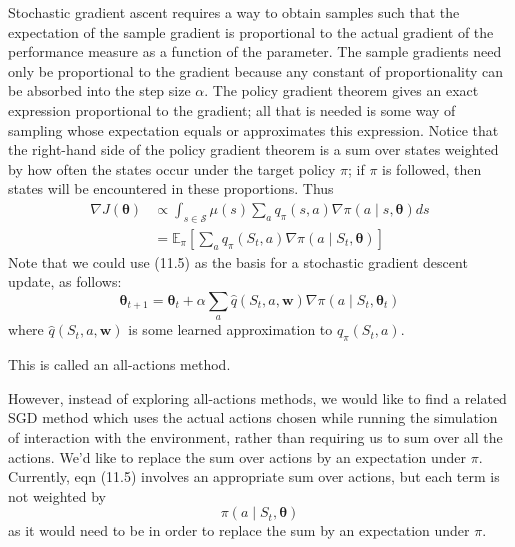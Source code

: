 \documentclass[11pt]{article}
\theoremstyle{plain} %
\theoremstyle{remark}
\begin{document}
Stochastic gradient ascent requires a way to obtain samples such that
  the expectation of the sample gradient is proportional to the actual gradient
  of the performance measure as a function of the parameter. The sample gradients need only be proportional to the gradient because
  any constant of proportionality can be absorbed into the step size $\alpha$.  The policy gradient theorem gives an exact expression proportional to
  the gradient; all that is needed is some way of sampling whose expectation
  equals or approximates this expression. Notice that the right-hand side of the policy gradient theorem is a sum
  over states weighted by how often the states occur under the target policy
  $\pi$; if $\pi$ is followed, then states will be encountered in these
  proportions. Thus
$$
\begin{aligned}
\nabla J(\boldsymbol{\theta}) & \propto \int_{s \in \mathcal{S}} \mu(s) \sum_{a} q_{\pi}(s, a) \nabla \pi(a \mid s, \boldsymbol{\theta}) d s \\
& =\mathbb{E}_{\pi}\left[\sum_{a} q_{\pi}\left(S_{t}, a\right) \nabla \pi\left(a \mid S_{t}, \boldsymbol{\theta}\right)\right]
\end{aligned}
$$
 Note that we could use (11.5) as the basis for a stochastic gradient
  descent update, as follows:
$$
\boldsymbol{\theta}_{t+1}=\boldsymbol{\theta}_{t}+\alpha \sum_{a} \hat{q}\left(S_{t}, a, \boldsymbol{w}\right) \nabla \pi\left(a \mid S_{t}, \boldsymbol{\theta}_{t}\right)
$$
where $\hat{q}\left(S_{t}, a, \boldsymbol{w}\right)$ is some learned
approximation to $q_{\pi}\left(S_{t}, a\right)$.

This is called an all-actions method.

However, instead of exploring all-actions methods, we would like to find
  a related SGD method which uses the actual actions chosen while running the
  simulation of interaction with the environment, rather than requiring us to
  sum over all the actions. We'd like to replace the sum over actions by an expectation under $\pi$. Currently, eqn (11.5) involves an appropriate sum over actions, but each
  term is not weighted by
$$
\pi\left(a \mid S_{t}, \boldsymbol{\theta}\right)
$$
as it would need to be in order to replace the sum by an expectation under
$\pi$.
 
\end{document}
